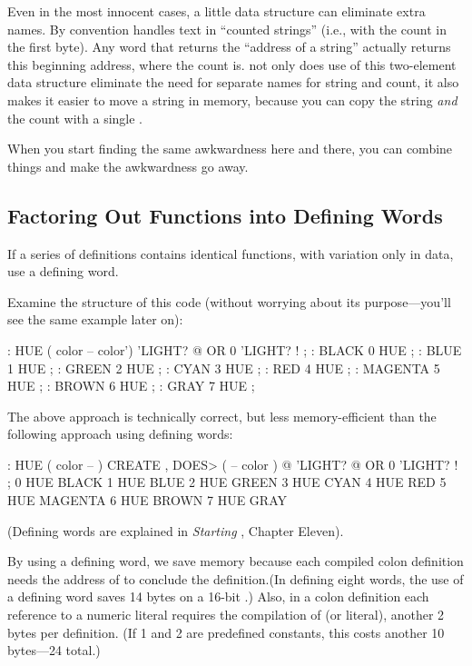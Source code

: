 Even in the most innocent cases, a little data structure can eliminate
extra names. By convention \Forth{} handles text in ``counted
strings'' (i.e., with the count in the first byte). Any word that
returns the ``address of a string'' actually returns this beginning
address, where the count is. not only does use of this two-element
data structure eliminate the need for separate names for string and
count, it also makes it easier to move a string in memory, because you
can copy the string \emph{and} the count with a single .

When you start finding the same awkwardness here and there, you can
combine things and make the awkwardness go away.

\subsection{Factoring Out Functions into Defining Words}

\begin{tip}
If a series of definitions contains identical functions, with
variation only in data, use a defining word.
\end{tip}
Examine the structure of this code (without worrying about its
purpose---you'll see the same example later on):

\begin{Code}
: HUE  ( color -- color') 
   'LIGHT? @  OR  0 'LIGHT? ! ;
: BLACK   0 HUE ;
: BLUE   1 HUE ;
: GREEN   2 HUE ;
: CYAN   3 HUE ;
: RED   4 HUE ;
: MAGENTA   5 HUE ;
: BROWN   6 HUE ;
: GRAY   7 HUE ;
\end{Code}

\noindent The above approach is technically correct, but less
memory-efficient than the following approach using defining words:

\begin{Code}
: HUE   ( color -- )  CREATE ,
   DOES>  ( -- color )  @ 'LIGHT? @  OR  0 'LIGHT? ! ;
 0 HUE BLACK         1 HUE BLUE          2 HUE GREEN
 3 HUE CYAN          4 HUE RED           5 HUE MAGENTA
 6 HUE BROWN         7 HUE GRAY
\end{Code}
(Defining words are explained in \emph{Starting \Forth{}}, Chapter Eleven).

By using a defining word, we save memory because each compiled colon
definition needs the address of  to conclude the
definition.(In defining eight words, the use of a defining word saves
14 bytes on a 16-bit \Forth{}.) Also, in a colon definition each
reference to a numeric literal requires the compilation of
 (or literal), another 2 bytes per definition. (If 1 and 2
are predefined constants, this costs another 10 bytes---24 total.)

